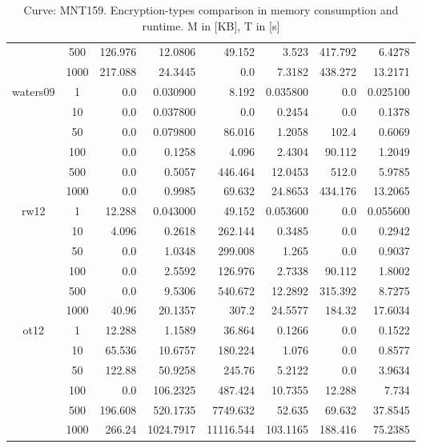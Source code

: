 \documentclass[twoside,11pt,titlepage,a4paper,english,bibliography=totocnumbered,listof=numbered]{scrbook}
\begin{document}
\begin{table}[ht]
{\begin{tabular}{|c|c|r|r|r|r|r|r|}
&500&  126.976    &   12.0806   &   49.152    &    3.523    &  417.792    &    6.4278    \\
&1000&  217.088    &   24.3445   &    0.0      &    7.3182   &  438.272    &   13.2171    \\
\hline
\multirow{6}{*}{waters09} &1&    0.0      &    0.030900 &    8.192    &    0.035800 &    0.0      &    0.025100  \\
&10&    0.0      &    0.037800 &    0.0      &    0.2454   &    0.0      &    0.1378    \\
&50&    0.0      &    0.079800 &   86.016    &    1.2058   &  102.4      &    0.6069    \\
&100&    0.0      &    0.1258   &    4.096    &    2.4304   &   90.112    &    1.2049    \\
&500&    0.0      &    0.5057   &  446.464    &   12.0453   &  512.0      &    5.9785    \\
&1000&    0.0      &    0.9985   &   69.632    &   24.8653   &  434.176    &   13.2065    \\
\hline
\multirow{6}{*}{rw12} &1&   12.288    &    0.043000 &   49.152    &    0.053600 &    0.0      &    0.055600  \\
&10&    4.096    &    0.2618   &  262.144    &    0.3485   &    0.0      &    0.2942    \\
&50&    0.0      &    1.0348   &  299.008    &    1.265    &    0.0      &    0.9037    \\
&100&    0.0      &    2.5592   &  126.976    &    2.7338   &   90.112    &    1.8002    \\
&500&    0.0      &    9.5306   &  540.672    &   12.2892   &  315.392    &    8.7275    \\
&1000&   40.96     &   20.1357   &  307.2      &   24.5577   &  184.32     &   17.6034    \\
\hline
\multirow{6}{*}{ot12} &1&   12.288    &    1.1589   &   36.864    &    0.1266   &    0.0      &    0.1522    \\
&10&   65.536    &   10.6757   &  180.224    &    1.076    &    0.0      &    0.8577    \\
&50&  122.88     &   50.9258   &  245.76     &    5.2122   &    0.0      &    3.9634    \\
&100&    0.0      &  106.2325   &  487.424    &   10.7355   &   12.288    &    7.734     \\
&500&  196.608    &  520.1735   & 7749.632    &   52.635    &   69.632    &   37.8545    \\
&1000&  266.24     & 1024.7917   &11116.544    &  103.1165   &  188.416    &   75.2385    \\
\hline
\end{tabular}}\caption{Curve: MNT159. Encryption-types comparison in memory consumption and runtime. M in [KB], T in [s]}\label{table:abe_mem_run_MNT159} \end{table} 
\end{document}
